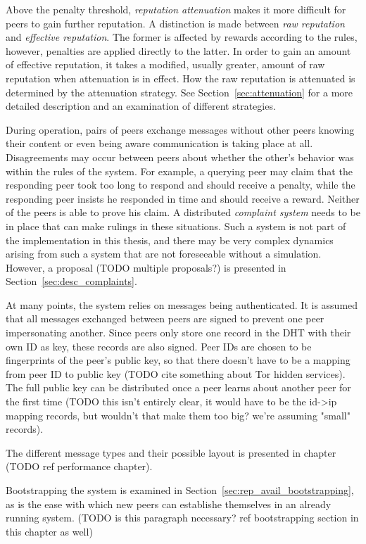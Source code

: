 Above the penalty threshold, \emph{reputation attenuation} makes it more
difficult for peers to gain further reputation. A distinction is made between
\emph{raw reputation} and \emph{effective reputation}. The former is affected by
rewards according to the rules, however, penalties are applied directly to the
latter. In order to gain an amount of effective reputation, it takes a modified,
usually greater, amount of raw reputation when attenuation is in effect. How the
raw reputation is attenuated is determined by the attenuation strategy. See
Section~\ref{sec:attenuation} for a more detailed description and an examination
of different strategies.

During operation, pairs of peers exchange messages without other peers knowing
their content or even being aware communication is taking place at all.
Disagreements may occur between peers about whether the other's behavior was
within the rules of the system. For example, a querying peer may claim that the
responding peer took too long to respond and should receive a penalty, while the
responding peer insists he responded in time and should receive a reward.
Neither of the peers is able to prove his claim. A distributed \emph{complaint
system} needs to be in place that can make rulings in these situations. Such a
system is not part of the implementation in this thesis, and there may be very
complex dynamics arising from such a system that are not foreseeable without a
simulation. However, a proposal (TODO multiple proposals?) is presented in
Section~\ref{sec:desc_complaints}.

At many points, the system relies on messages being authenticated. It is assumed
that all messages exchanged between peers are signed to prevent one peer
impersonating another. Since peers only store one record in the \ac{DHT} with
their own ID as key, these records are also signed. Peer IDs are chosen to be
fingerprints of the peer's public key, so that there doesn't have to be a
mapping from peer ID to public key (TODO cite something about Tor hidden
services). The full public key can be distributed once a peer learns about
another peer for the first time (TODO this isn't entirely clear, it would have
to be the id->ip mapping records, but wouldn't that make them too big? we're
assuming "small" records).

The different message types and their possible layout is presented in chapter
(TODO ref performance chapter).

Bootstrapping the system is examined in
Section~\ref{sec:rep_avail_bootstrapping}, as is the ease with which new peers
can establishe themselves in an already running system. (TODO is this paragraph
necessary? ref bootstrapping section in this chapter as well)

